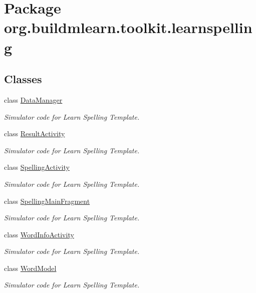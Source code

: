 \hypertarget{namespaceorg_1_1buildmlearn_1_1toolkit_1_1learnspelling}{\section{Package org.\-buildmlearn.\-toolkit.\-learnspelling}
\label{namespaceorg_1_1buildmlearn_1_1toolkit_1_1learnspelling}
}
\subsection*{Classes}
\begin{DoxyCompactItemize}
\item 
class \hyperlink{classorg_1_1buildmlearn_1_1toolkit_1_1learnspelling_1_1DataManager}{Data\-Manager}
\begin{DoxyCompactList}\small\item\em Simulator code for Learn Spelling Template. \end{DoxyCompactList}\item 
class \hyperlink{classorg_1_1buildmlearn_1_1toolkit_1_1learnspelling_1_1ResultActivity}{Result\-Activity}
\begin{DoxyCompactList}\small\item\em Simulator code for Learn Spelling Template. \end{DoxyCompactList}\item 
class \hyperlink{classorg_1_1buildmlearn_1_1toolkit_1_1learnspelling_1_1SpellingActivity}{Spelling\-Activity}
\begin{DoxyCompactList}\small\item\em Simulator code for Learn Spelling Template. \end{DoxyCompactList}\item 
class \hyperlink{classorg_1_1buildmlearn_1_1toolkit_1_1learnspelling_1_1SpellingMainFragment}{Spelling\-Main\-Fragment}
\begin{DoxyCompactList}\small\item\em Simulator code for Learn Spelling Template. \end{DoxyCompactList}\item 
class \hyperlink{classorg_1_1buildmlearn_1_1toolkit_1_1learnspelling_1_1WordInfoActivity}{Word\-Info\-Activity}
\begin{DoxyCompactList}\small\item\em Simulator code for Learn Spelling Template. \end{DoxyCompactList}\item 
class \hyperlink{classorg_1_1buildmlearn_1_1toolkit_1_1learnspelling_1_1WordModel}{Word\-Model}
\begin{DoxyCompactList}\small\item\em Simulator code for Learn Spelling Template. \end{DoxyCompactList}\end{DoxyCompactItemize}
